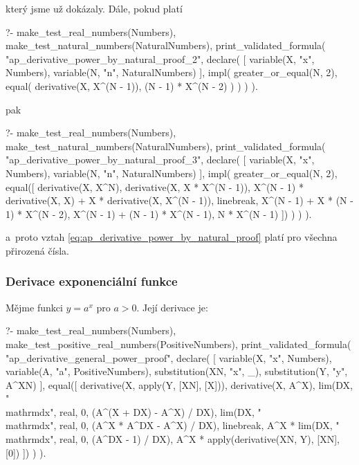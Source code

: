 který jsme už dokázaly. Dále, pokud platí 

\begin{prolog}
?-	make_test_real_numbers(Numbers),
	make_test_natural_numbers(NaturalNumbers),
	print_validated_formula(
		"ap_derivative_power_by_natural_proof_2",
		declare(
			[
				variable(X, "x", Numbers),
				variable(N, "n", NaturalNumbers)
			],
			impl(
				greater_or_equal(N, 2),
				equal(
					derivative(X, X^(N - 1)),
					(N - 1) * X^(N - 2)
				)
			)
		)
	).
\end{prolog}

pak

\begin{prolog}
?-	make_test_real_numbers(Numbers),
	make_test_natural_numbers(NaturalNumbers),
	print_validated_formula(
		"ap_derivative_power_by_natural_proof_3",
		declare(
			[
				variable(X, "x", Numbers),
				variable(N, "n", NaturalNumbers)
			],
			impl(
				greater_or_equal(N, 2),
				equal([
					derivative(X, X^N),
					derivative(X, X * X^(N - 1)),
					X^(N - 1) * derivative(X, X) + X * derivative(X, X^(N - 1)),
					linebreak,				
					X^(N - 1) + X * (N - 1) * X^(N - 2),
					X^(N - 1) + (N - 1) * X^(N - 1),
					N * X^(N - 1)
				])
			)
		)
	).
\end{prolog}

a~proto vztah \eqref{eq:ap_derivative_power_by_natural_proof} platí pro všechna přirozená čísla.

\subsubsection{Derivace exponenciální funkce}

Mějme funkci \(y = a^x\) pro \(a > 0\). Její derivace je:


\begin{prolog}
?-	make_test_real_numbers(Numbers),
	make_test_positive_real_numbers(PositiveNumbers),
	print_validated_formula(
		"ap_derivative_general_power_proof",
		declare(
			[
				variable(X, "x", Numbers),
				variable(A, "a", PositiveNumbers),
				substitution(XN, "x", _),
				substitution(Y, "y", A^XN)
			],
			equal([
				derivative(X, apply(Y, [XN], [X])),
				derivative(X, A^X),
				lim(DX, "\\mathrm{d}x", real, 0, (A^(X + DX) - A^X) / DX),
				lim(DX, "\\mathrm{d}x", real, 0, (A^X * A^DX - A^X) / DX),
				linebreak,
				A^X * lim(DX, "\\mathrm{d}x", real, 0, (A^DX - 1) / DX),
				A^X * apply(derivative(XN, Y), [XN], [0])
			])
		)
	).
\end{prolog}

